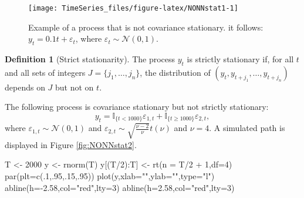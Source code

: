 \documentclass[
  12pt,
]{book}
\newenvironment{Shaded}{\begin{snugshade}}{\end{snugshade}}
\newcommand{\AttributeTok}[1]{\textcolor[rgb]{0.77,0.63,0.00}{#1}}
\newcommand{\DecValTok}[1]{\textcolor[rgb]{0.00,0.00,0.81}{#1}}
\newcommand{\FloatTok}[1]{\textcolor[rgb]{0.00,0.00,0.81}{#1}}
\newcommand{\FunctionTok}[1]{\textcolor[rgb]{0.00,0.00,0.00}{#1}}
\newcommand{\NormalTok}[1]{#1}
\newcommand{\OtherTok}[1]{\textcolor[rgb]{0.56,0.35,0.01}{#1}}
\newcommand{\SpecialCharTok}[1]{\textcolor[rgb]{0.00,0.00,0.00}{#1}}
\newcommand{\StringTok}[1]{\textcolor[rgb]{0.31,0.60,0.02}{#1}}
\theoremstyle{definition}
\newtheorem{definition}{Definition}[chapter]
\theoremstyle{definition}
\theoremstyle{definition}
\theoremstyle{definition}
\theoremstyle{remark}
\begin{document}
\begin{figure}
\texttt{[image: TimeSeries\_files/figure-latex/NONNstat1-1]} \caption{Example of a process that is not covariance stationary. it follows: $y_t = 0.1t + \varepsilon_t$, where $\varepsilon_t \sim \mathcal{N}(0,1)$.}\label{fig:NONNstat1}
\end{figure}

\begin{definition}[Strict stationarity]
\protect\hypertarget{def:strictstat}{}\label{def:strictstat}The process \(y_t\) is strictly stationary if, for all \(t\) and all sets of integers \(J=\{j_1,\dots,j_n\}\), the distribution of \((y_{t},y_{t+j_1},\dots,y_{t+j_n})\) depends on \(J\) but not on \(t\).
\end{definition}

The following process is covariance stationary but not strictly stationary:
\[
y_t = \mathbb{I}_{\{t<1000\}}\varepsilon_{1,t}+\mathbb{I}_{\{t\ge1000\}}\varepsilon_{2,t},
\]
where \(\varepsilon_{1,t} \sim \mathcal{N}(0,1)\) and \(\varepsilon_{2,t} \sim \sqrt{\frac{\nu - 2}{\nu}} t(\nu)\) and \(\nu = 4\). A simulated path is displayed in Figure \ref{fig:NONNstat2}.

\begin{Shaded}
\begin{Highlighting}[]
\NormalTok{T }\OtherTok{\textless{}{-}} \DecValTok{2000}
\NormalTok{y }\OtherTok{\textless{}{-}} \FunctionTok{rnorm}\NormalTok{(T)}
\NormalTok{y[(T}\SpecialCharTok{/}\DecValTok{2}\NormalTok{)}\SpecialCharTok{:}\NormalTok{T] }\OtherTok{\textless{}{-}} \FunctionTok{rt}\NormalTok{(}\AttributeTok{n =}\NormalTok{ T}\SpecialCharTok{/}\DecValTok{2} \SpecialCharTok{+} \DecValTok{1}\NormalTok{,}\AttributeTok{df=}\DecValTok{4}\NormalTok{)}
\FunctionTok{par}\NormalTok{(}\AttributeTok{plt=}\FunctionTok{c}\NormalTok{(.}\DecValTok{1}\NormalTok{,.}\DecValTok{95}\NormalTok{,.}\DecValTok{15}\NormalTok{,.}\DecValTok{95}\NormalTok{))}
\FunctionTok{plot}\NormalTok{(y,}\AttributeTok{xlab=}\StringTok{""}\NormalTok{,}\AttributeTok{ylab=}\StringTok{""}\NormalTok{,}\AttributeTok{type=}\StringTok{"l"}\NormalTok{)}
\FunctionTok{abline}\NormalTok{(}\AttributeTok{h=}\SpecialCharTok{{-}}\FloatTok{2.58}\NormalTok{,}\AttributeTok{col=}\StringTok{"red"}\NormalTok{,}\AttributeTok{lty=}\DecValTok{3}\NormalTok{)}
\FunctionTok{abline}\NormalTok{(}\AttributeTok{h=}\FloatTok{2.58}\NormalTok{,}\AttributeTok{col=}\StringTok{"red"}\NormalTok{,}\AttributeTok{lty=}\DecValTok{3}\NormalTok{)}
\end{Highlighting}
\end{Shaded}
\end{document}
